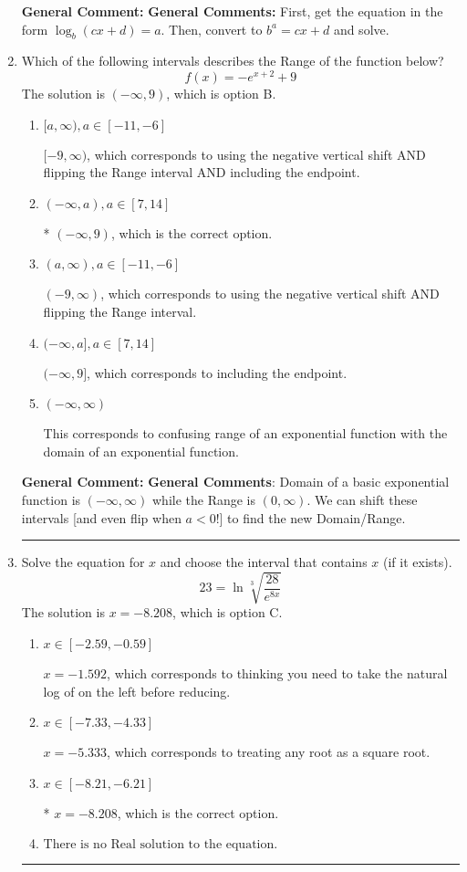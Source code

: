 \documentclass{extbook}[14pt]
\newcommand{\litem}[1]{\item #1

\rule{\textwidth}{0.4pt}}
\begin{document}
\begin{enumerate}
{\textbf{General Comment:} \textbf{General Comments:} First, get the equation in the form $\log_b{(cx+d)} = a$. Then, convert to $b^a = cx+d$ and solve.
}
\litem{
Which of the following intervals describes the Range of the function below?
\[ f(x) = -e^{x+2}+9 \]The solution is \( (-\infty, 9) \), which is option B.\begin{enumerate}[label=\Alph*.]
\item \( [a, \infty), a \in [-11, -6] \)

$[-9, \infty)$, which corresponds to using the negative vertical shift AND flipping the Range interval AND including the endpoint.
\item \( (-\infty, a), a \in [7, 14] \)

* $(-\infty, 9)$, which is the correct option.
\item \( (a, \infty), a \in [-11, -6] \)

$(-9, \infty)$, which corresponds to using the negative vertical shift AND flipping the Range interval.
\item \( (-\infty, a], a \in [7, 14] \)

$(-\infty, 9]$, which corresponds to including the endpoint.
\item \( (-\infty, \infty) \)

This corresponds to confusing range of an exponential function with the domain of an exponential function.
\end{enumerate}

\textbf{General Comment:} \textbf{General Comments}: Domain of a basic exponential function is $(-\infty, \infty)$ while the Range is $(0, \infty)$. We can shift these intervals [and even flip when $a<0$!] to find the new Domain/Range.
}
\litem{
 Solve the equation for $x$ and choose the interval that contains $x$ (if it exists).
\[  23 = \ln{\sqrt[3]{\frac{28}{e^{8x}}}} \]The solution is \( x = -8.208 \), which is option C.\begin{enumerate}[label=\Alph*.]
\item \( x \in [-2.59, -0.59] \)

$x = -1.592$, which corresponds to thinking you need to take the natural log of on the left before reducing.
\item \( x \in [-7.33, -4.33] \)

$x = -5.333$, which corresponds to treating any root as a square root.
\item \( x \in [-8.21, -6.21] \)

* $x = -8.208$, which is the correct option.
\item \( \text{There is no Real solution to the equation.} \)


\end{enumerate}}
\end{enumerate}
\end{document}
